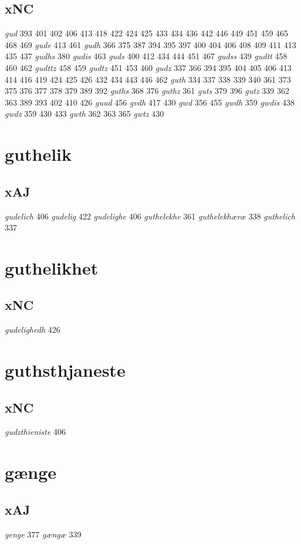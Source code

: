 \documentclass[a4paper,twocolumn]{article}
\begin{document}
\subsection{xNC}
\label{sec:org3a07c3e}
\emph{gud} 393 401 402 406 413 418 422 424 425 433 434 436 442 446 449 451 459 465 468 469 \emph{gude} 413 461 \emph{gudh} 366 375 387 394 395 397 400 404 406 408 409 411 413 435 437 \emph{gudhs} 380 \emph{gudis} 463 \emph{guds} 400 412 434 444 451 467 \emph{gudss} 439 \emph{gudtt} 458 460 462 \emph{gudttz} 458 459 \emph{gudtz} 451 453 460 \emph{gudz} 337 366 394 395 404 405 406 413 414 416 419 424 425 426 432 434 443 446 462 \emph{guth} 334 337 338 339 340 361 373 375 376 377 378 379 389 392 \emph{guths} 368 376 \emph{guthz} 361 \emph{guts} 379 396 \emph{gutz} 339 362 363 389 393 402 410 426 \emph{guud} 456 \emph{gvdh} 417 430 \emph{gwd} 356 455 \emph{gwdh} 359 \emph{gwdis} 438 \emph{gwdz} 359 430 433 \emph{gwth} 362 363 365 \emph{gwtz} 430 
\section{guthelik}
\label{sec:org85ee177}
\subsection{xAJ}
\label{sec:orgc514b5b}
\emph{gudelich} 406 \emph{gudelig} 422 \emph{gudelighe} 406 \emph{guthelekhe} 361 \emph{guthelekhæræ} 338 \emph{guthelich} 337 
\section{guthelikhet}
\label{sec:org4767bfa}
\subsection{xNC}
\label{sec:org3099d4b}
\emph{gudelighedh} 426 
\section{guthsthjaneste}
\label{sec:orgc3bb513}
\subsection{xNC}
\label{sec:org9276da5}
\emph{gudzthieniste} 406 
\section{gænge}
\label{sec:org2bf2c60}
\subsection{xAJ}
\label{sec:org51e396e}
\emph{genge} 377 \emph{gængæ} 339 
\end{document}
